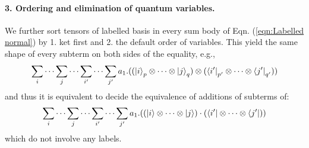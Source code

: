 \paragraph*{3. Ordering and elimination of quantum variables.} 
We further sort tensors of labelled basis in every sum body of Eqn. (\ref{eqn:Labelled normal}) by 1. ket first and 2. the default order of variables. This yield the same shape of every subterm on both sides of the equality, e.g., 
\begin{equation}
  \label{eqn:Labelled normal1}
  \sum_{i}\cdots\sum_{j}\cdots \sum_{i'}\cdots\sum_{j'} a_1 . ((\ket{i}_p \otimes \cdots \otimes \ket{j}_q) \otimes (\bra{i'}_{p'}\otimes\cdots\otimes \bra{j'}_{q'}))
\end{equation}
and thus it is equivalent to decide the equivalence of additions of subterms of:
\begin{equation}
  \label{eqn:Labelled normal2}
  \sum_{i}\cdots\sum_{j}\cdots \sum_{i'}\cdots\sum_{j'} a_1 . ((\ket{i} \otimes \cdots \otimes \ket{j}) \cdot (\bra{i'}\otimes\cdots\otimes \bra{j'}))
\end{equation}
which do not involve any labels. 

